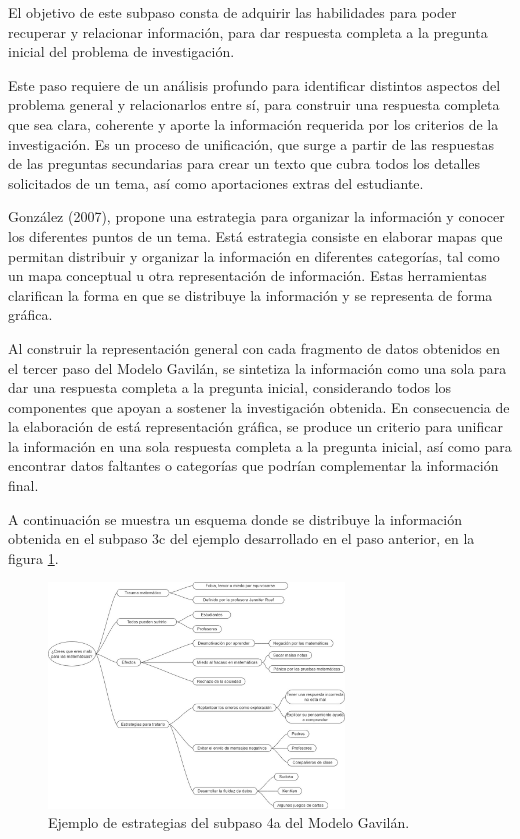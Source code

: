 El objetivo de este subpaso consta de adquirir las habilidades para poder recuperar y relacionar información, para dar respuesta completa a la pregunta inicial del problema de investigación.

Este paso requiere de un análisis profundo para identificar distintos aspectos del problema general y relacionarlos entre sí, para construir una respuesta completa que sea clara, coherente y aporte la información requerida por los criterios de la investigación. Es un proceso de unificación, que surge a partir de las respuestas de las preguntas secundarias para crear un texto que cubra todos los detalles solicitados de un tema, así como aportaciones extras del estudiante.

González (2007), propone una estrategia para organizar la información y conocer los diferentes puntos de un tema. Está estrategia consiste en elaborar mapas que permitan distribuir y organizar la información en diferentes categorías, tal como un mapa conceptual u otra representación de información. Estas herramientas clarifican la forma en que se distribuye la información y se representa de forma gráfica.

Al construir la representación general con cada fragmento de datos obtenidos en el tercer paso del Modelo Gavilán, se sintetiza la información como una sola para dar una respuesta completa a la pregunta inicial, considerando todos los componentes que apoyan a sostener la investigación obtenida. En consecuencia de la elaboración de está representación gráfica, se produce un criterio para unificar la información en una sola respuesta completa a la pregunta inicial, así como para encontrar datos faltantes o categorías que podrían complementar la información final.

A continuación se muestra un esquema donde se distribuye la información obtenida en el subpaso 3c del ejemplo  desarrollado en el paso anterior, en la figura \ref{fig:27}.

\begin{figure}
  \centering
  \includegraphics[width=0.70\textwidth]{Cap2/Figuras/Ejemplo de estraregia del subpaso 4a.jpg}
  \caption{Ejemplo de estrategias del subpaso 4a del Modelo Gavilán.}
  \label{fig:27}
\end{figure}

